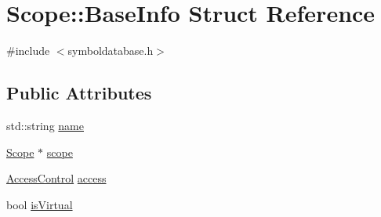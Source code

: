 \hypertarget{struct_scope_1_1_base_info}{\section{Scope\-:\-:Base\-Info Struct Reference}
\label{struct_scope_1_1_base_info}
}


{\ttfamily \#include $<$symboldatabase.\-h$>$}

\subsection*{Public Attributes}
\begin{DoxyCompactItemize}
\item 
std\-::string \hyperlink{struct_scope_1_1_base_info_a1108c2c0472d3040a519f40e6b8dae37}{name}
\item 
\hyperlink{class_scope}{Scope} $\ast$ \hyperlink{struct_scope_1_1_base_info_a1f9d93e11a4e852b4f1369b65df15ddc}{scope}
\item 
\hyperlink{symboldatabase_8h_a2e9a0288e6c2df2ecebc50944c3ff9fa}{Access\-Control} \hyperlink{struct_scope_1_1_base_info_a8df5353632878e299ebae3c5d8563e26}{access}
\item 
bool \hyperlink{struct_scope_1_1_base_info_acd3c79704b39f242a659afc3ba076351}{is\-Virtual}
\end{DoxyCompactItemize}


